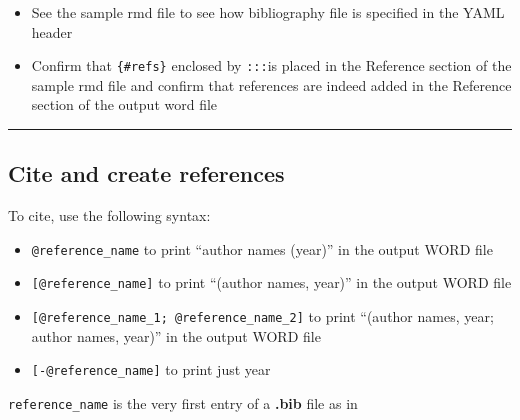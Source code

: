 \documentclass[
  letterpaper,
  DIV=11,
  numbers=noendperiod]{scrreprt}
\providecommand{\tightlist}{%
  \setlength{\itemsep}{0pt}\setlength{\parskip}{0pt}}\usepackage{longtable,booktabs,array}
\begin{document}
\begin{tcolorbox}[enhanced jigsaw, colframe=quarto-callout-note-color-frame, toptitle=1mm, colbacktitle=quarto-callout-note-color!10!white, toprule=.15mm, colback=white, arc=.35mm, bottomtitle=1mm, opacitybacktitle=0.6, breakable, left=2mm, coltitle=black, leftrule=.75mm, title=\textcolor{quarto-callout-note-color}{\faInfo}\hspace{0.5em}{Note}, rightrule=.15mm, titlerule=0mm, opacityback=0, bottomrule=.15mm]

\begin{itemize}
\tightlist
\item
  See the sample rmd file to see how bibliography file is specified in
  the YAML header
\item
  Confirm that \texttt{\{\#refs\}} enclosed by \texttt{:::}is placed in
  the Reference section of the sample rmd file and confirm that
  references are indeed added in the Reference section of the output
  word file
\end{itemize}

\end{tcolorbox}

\begin{center}\rule{0.5\linewidth}{0.5pt}\end{center}

\hypertarget{cite-and-create-references}{%
\subsection{Cite and create
references}\label{cite-and-create-references}}

To cite, use the following syntax:

\begin{itemize}
\tightlist
\item
  \texttt{@reference\_name} to print ``author names (year)'' in the
  output WORD file
\item
  \texttt{{[}@reference\_name{]}} to print ``(author names, year)'' in
  the output WORD file
\item
  \texttt{{[}@reference\_name\_1;\ @reference\_name\_2{]}} to print
  ``(author names, year; author names, year)'' in the output WORD file
\item
  \texttt{{[}-@reference\_name{]}} to print just year
\end{itemize}

\texttt{reference\_name} is the very first entry of a \textbf{.bib} file
as in
\end{document}
